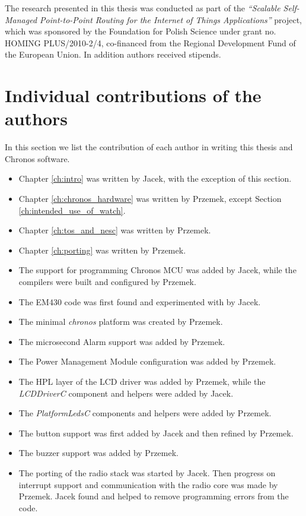The research presented in this thesis was conducted as part of the {\it``Scalable Self-Managed Point-to-Point Routing for the Internet of Things Applications''} project, which was sponsored by the Foundation for Polish Science under grant no. HOMING PLUS/2010-2/4, co-financed from the Regional Development Fund of the European Union. In addition authors received stipends.

\section{Individual contributions of the authors}
In this section we list the contribution of each author in writing this thesis and Chronos software.

\begin{itemize}
  \item Chapter \ref{ch:intro} was written by Jacek, with the exception of this section.
  \item Chapter \ref{ch:chronos_hardware} was written by Przemek, except Section \ref{ch:intended_use_of_watch}.
  \item Chapter \ref{ch:tos_and_nesc} was written by Przemek.
  \item Chapter \ref{ch:porting} was written by Przemek.
  \item The support for programming Chronos MCU was added by Jacek, while the compilers were built and configured by Przemek.
  \item The EM430 code was first found and experimented with by Jacek.
  \item The minimal \emph{chronos} platform was created by Przemek.
  \item The microsecond Alarm support was added by Przemek.
  \item The Power Management Module configuration was added by Przemek.
  \item The HPL layer of the LCD driver was added by Przemek, while the  \emph{LCDDriverC} component and helpers were added by Jacek.
  \item The \emph{PlatformLedsC} components and helpers were added by Przemek.
  \item The button support was first added by Jacek and then refined by Przemek.
  \item The buzzer support was added by Przemek.
  \item The porting of the radio stack was started by Jacek. Then progress on interrupt support and communication with the radio core was made by Przemek. Jacek found and helped to remove programming errors from the code.

\end{itemize}
